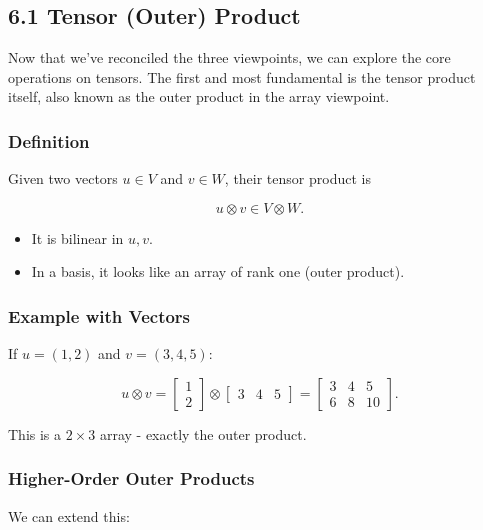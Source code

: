 \documentclass[
  letterpaper,
  DIV=11,
  numbers=noendperiod]{scrreprt}
\providecommand{\tightlist}{%
  \setlength{\itemsep}{0pt}\setlength{\parskip}{0pt}}
\begin{document}
\subsection{6.1 Tensor (Outer) Product}\label{tensor-outer-product}

Now that we've reconciled the three viewpoints, we can explore the core
operations on tensors. The first and most fundamental is the tensor
product itself, also known as the outer product in the array viewpoint.

\subsubsection{Definition}\label{definition}

Given two vectors \(u \in V\) and \(v \in W\), their tensor product is

\[
u \otimes v \in V \otimes W.
\]

\begin{itemize}
\tightlist
\item
  It is bilinear in \(u,v\).
\item
  In a basis, it looks like an array of rank one (outer product).
\end{itemize}

\subsubsection{Example with Vectors}\label{example-with-vectors}

If \(u = (1,2)\) and \(v = (3,4,5)\):

\[
u \otimes v =
\begin{bmatrix}1 \\ 2\end{bmatrix}
\otimes
\begin{bmatrix}3 & 4 & 5\end{bmatrix}
=
\begin{bmatrix}
3 & 4 & 5 \\
6 & 8 & 10
\end{bmatrix}.
\]

This is a \(2 \times 3\) array - exactly the outer product.

\subsubsection{Higher-Order Outer
Products}\label{higher-order-outer-products}

We can extend this:
\end{document}
